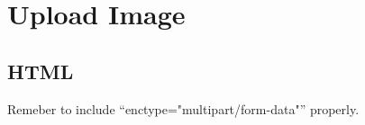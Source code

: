
\chapter{Upload Image}

\section{HTML}

Remeber to include ``enctype="multipart/form-data"'' properly.
